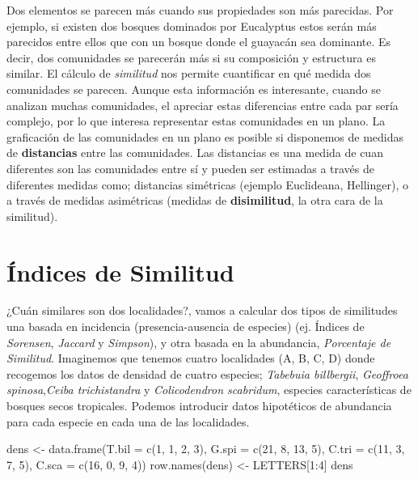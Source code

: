 \documentclass[
]{article}
\newenvironment{Shaded}{\begin{snugshade}}{\end{snugshade}}
\newcommand{\AttributeTok}[1]{\textcolor[rgb]{0.77,0.63,0.00}{#1}}
\newcommand{\DecValTok}[1]{\textcolor[rgb]{0.00,0.00,0.81}{#1}}
\newcommand{\FunctionTok}[1]{\textcolor[rgb]{0.00,0.00,0.00}{#1}}
\newcommand{\NormalTok}[1]{#1}
\newcommand{\OtherTok}[1]{\textcolor[rgb]{0.56,0.35,0.01}{#1}}
\newcommand{\SpecialCharTok}[1]{\textcolor[rgb]{0.00,0.00,0.00}{#1}}
\begin{document}
Dos elementos se parecen más cuando sus propiedades son más parecidas. Por ejemplo, si existen dos bosques dominados por Eucalyptus estos serán más parecidos entre ellos que con un bosque donde el guayacán sea dominante. Es decir, dos comunidades se parecerán más si su composición y estructura es similar. El cálculo de \emph{similitud} nos permite cuantificar en qué medida dos comunidades se parecen. Aunque esta información es interesante, cuando se analizan muchas comunidades, el apreciar estas diferencias entre cada par sería complejo, por lo que interesa representar estas comunidades en un plano. La graficación de las comunidades en un plano es posible si disponemos de medidas de \textbf{distancias} entre las comunidades. Las distancias es una medida de cuan diferentes son las comunidades entre sí y pueden ser estimadas a través de diferentes medidas como; distancias simétricas (ejemplo Euclideana, Hellinger), o a través de medidas asimétricas (medidas de \textbf{disimilitud}, la otra cara de la similitud).

\hypertarget{uxedndices-de-similitud}{%
\section{Índices de Similitud}\label{uxedndices-de-similitud}}

¿Cuán similares son dos localidades?, vamos a calcular dos tipos de similitudes una basada en incidencia (presencia-ausencia de especies) (ej. Índices de \emph{Sorensen}, \emph{Jaccard} y \emph{Simpson}), y otra basada en la abundancia, \emph{Porcentaje de Similitud}. Imaginemos que tenemos cuatro localidades (A, B, C, D) donde recogemos los datos de densidad de cuatro especies; \emph{Tabebuia billbergii}, \emph{Geoffroea spinosa},\emph{Ceiba trichistandra} y \emph{Colicodendron scabridum}, especies características de bosques secos tropicales. Podemos introducir datos hipotéticos de abundancia para cada especie en cada una de las localidades.

\begin{Shaded}
\begin{Highlighting}[]
\NormalTok{dens }\OtherTok{\textless{}{-}} \FunctionTok{data.frame}\NormalTok{(}\AttributeTok{T.bil =} \FunctionTok{c}\NormalTok{(}\DecValTok{1}\NormalTok{, }\DecValTok{1}\NormalTok{, }\DecValTok{2}\NormalTok{, }\DecValTok{3}\NormalTok{), }\AttributeTok{G.spi =} \FunctionTok{c}\NormalTok{(}\DecValTok{21}\NormalTok{, }\DecValTok{8}\NormalTok{, }\DecValTok{13}\NormalTok{, }\DecValTok{5}\NormalTok{),}
                   \AttributeTok{C.tri =} \FunctionTok{c}\NormalTok{(}\DecValTok{11}\NormalTok{, }\DecValTok{3}\NormalTok{, }\DecValTok{7}\NormalTok{, }\DecValTok{5}\NormalTok{), }\AttributeTok{C.sca =} \FunctionTok{c}\NormalTok{(}\DecValTok{16}\NormalTok{, }\DecValTok{0}\NormalTok{, }\DecValTok{9}\NormalTok{, }\DecValTok{4}\NormalTok{))}
\FunctionTok{row.names}\NormalTok{(dens) }\OtherTok{\textless{}{-}}\NormalTok{ LETTERS[}\DecValTok{1}\SpecialCharTok{:}\DecValTok{4}\NormalTok{]}
\NormalTok{dens}
\end{Highlighting}
\end{Shaded}
\end{document}
